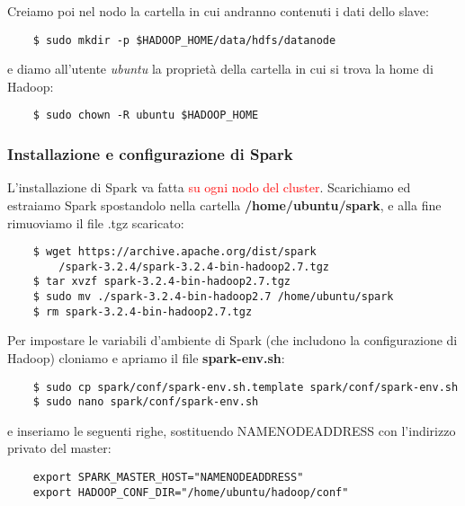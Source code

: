 Creiamo poi nel nodo la cartella in cui andranno contenuti i dati dello slave:

\begin{verbatim}
    $ sudo mkdir -p $HADOOP_HOME/data/hdfs/datanode
\end{verbatim}

e diamo all'utente \textit{ubuntu} la proprietà della cartella in cui si trova la home di Hadoop:

\begin{verbatim}
    $ sudo chown -R ubuntu $HADOOP_HOME
\end{verbatim}




\subsubsection{Installazione e configurazione di Spark}

L'installazione di Spark va fatta \textcolor{red}{su ogni nodo del cluster}. Scarichiamo ed estraiamo
Spark spostandolo nella cartella \textbf{/home/ubuntu/spark}, e alla fine rimuoviamo il
file .tgz scaricato:

\begin{verbatim}
    $ wget https://archive.apache.org/dist/spark
        /spark-3.2.4/spark-3.2.4-bin-hadoop2.7.tgz
    $ tar xvzf spark-3.2.4-bin-hadoop2.7.tgz
    $ sudo mv ./spark-3.2.4-bin-hadoop2.7 /home/ubuntu/spark
    $ rm spark-3.2.4-bin-hadoop2.7.tgz
\end{verbatim}

Per impostare le variabili d'ambiente di Spark (che includono la configurazione di Hadoop) cloniamo e apriamo il file \textbf{spark-env.sh}:

\begin{verbatim}
    $ sudo cp spark/conf/spark-env.sh.template spark/conf/spark-env.sh
    $ sudo nano spark/conf/spark-env.sh
\end{verbatim}

e inseriamo le seguenti righe, sostituendo NAMENODEADDRESS con l'indirizzo privato del master:

\begin{verbatim}
    export SPARK_MASTER_HOST="NAMENODEADDRESS"
    export HADOOP_CONF_DIR="/home/ubuntu/hadoop/conf"
\end{verbatim}
